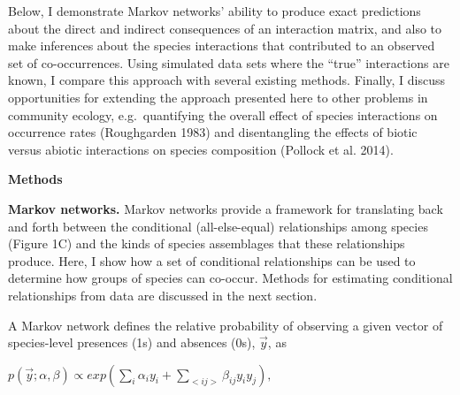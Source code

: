 \documentclass[12pt,]{article}
\begin{document}
\begin{spacing}{1.9}
\begin{flushleft}
Below, I demonstrate Markov networks' ability to produce exact
predictions about the direct and indirect consequences of an interaction
matrix, and also to make inferences about the species interactions that
contributed to an observed set of co-occurrences. Using simulated data
sets where the ``true'' interactions are known, I compare this approach
with several existing methods. Finally, I discuss opportunities for
extending the approach presented here to other problems in community
ecology, e.g.~quantifying the overall effect of species interactions on
occurrence rates (Roughgarden 1983) and disentangling the effects of
biotic versus abiotic interactions on species composition (Pollock et
al. 2014).

\noindent\textbf{Methods}

\noindent
\textbf{Markov networks.} Markov networks provide a framework for
translating back and forth between the conditional (all-else-equal)
relationships among species (Figure 1C) and the kinds of species
assemblages that these relationships produce. Here, I show how a set of
conditional relationships can be used to determine how groups of species
can co-occur. Methods for estimating conditional relationships from data
are discussed in the next section.

A Markov network defines the relative probability of observing a given
vector of species-level presences (1s) and absences (0s), \(\vec{y}\),
as

\centering

\(\displaystyle{p(\vec{y}; \alpha, \beta) \propto exp(\sum_{i}\alpha_i y_i + \sum_{<ij>}\beta_{ij}y_i y_j),}\)

\raggedright
\setlength{\parindent}{2em}


\end{flushleft}
\end{spacing}
\end{document}

